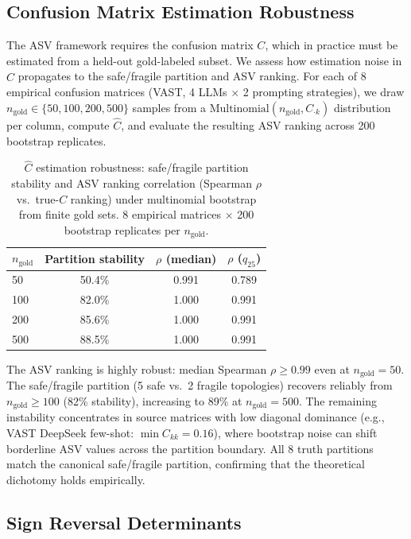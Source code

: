 \subsection{Confusion Matrix Estimation Robustness}
\label{sec:c_robustness}

The ASV framework requires the confusion matrix $C$, which in practice must be estimated from a held-out gold-labeled subset. We assess how estimation noise in $\hat{C}$ propagates to the safe/fragile partition and ASV ranking. For each of 8 empirical confusion matrices (VAST, 4 LLMs $\times$ 2 prompting strategies), we draw $n_{\text{gold}} \in \{50, 100, 200, 500\}$ samples from a $\text{Multinomial}(n_{\text{gold}}, C_{\cdot k})$ distribution per column, compute $\hat{C}$, and evaluate the resulting ASV ranking across 200 bootstrap replicates.

\begin{table}[h]
\centering
\small
\caption{$\hat{C}$ estimation robustness: safe/fragile partition stability and ASV ranking correlation (Spearman $\rho$ vs.\ true-$C$ ranking) under multinomial bootstrap from finite gold sets. 8 empirical matrices $\times$ 200 bootstrap replicates per $n_{\text{gold}}$.}
\label{tab:c_robustness}
\begin{tabular}{lccc}
\toprule
$n_{\text{gold}}$ & Partition stability & $\rho$ (median) & $\rho$ ($q_{25}$) \\
\midrule
50 & 50.4\% & 0.991 & 0.789 \\
100 & 82.0\% & 1.000 & 0.991 \\
200 & 85.6\% & 1.000 & 0.991 \\
500 & 88.5\% & 1.000 & 0.991 \\
\bottomrule
\end{tabular}
\end{table}

The ASV ranking is highly robust: median Spearman $\rho \geq 0.99$ even at $n_{\text{gold}}{=}50$. The safe/fragile partition (5 safe vs.\ 2 fragile topologies) recovers reliably from $n_{\text{gold}} \geq 100$ (82\% stability), increasing to 89\% at $n_{\text{gold}}{=}500$. The remaining instability concentrates in source matrices with low diagonal dominance (e.g., VAST DeepSeek few-shot: $\min C_{kk} = 0.16$), where bootstrap noise can shift borderline ASV values across the partition boundary. All 8 truth partitions match the canonical safe/fragile partition, confirming that the theoretical dichotomy holds empirically.

\subsection{Sign Reversal Determinants}
\label{sec:sign_determinants}

